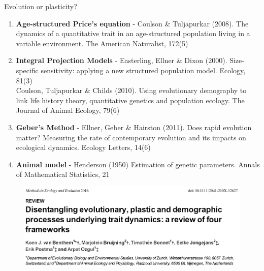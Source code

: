 \documentclass[10pt]{beamer}%
\begin{document}
\begin{frame}{Evolution or plasticity?}

	\begin{enumerate}[<+->]
		\item \textbf{Age-structured Price's equation} \footnotesize - Coulson \& Tuljapurkar (2008). The dynamics of a quantitative trait in an age-structured population living in a variable environment. The American Naturalist, 172(5)
		\item \textbf{Integral Projection Models} \footnotesize - Easterling, Ellner \& Dixon (2000). Size-specific sensitivity: applying a new structured population model. Ecology, 81(3)\\
		Coulson, Tuljapurkar \& Childs (2010). Using evolutionary demography to link life history theory, quantitative genetics and population ecology. The Journal of Animal Ecology, 79(6)
		\item \textbf{Geber's Method} \footnotesize - Ellner, Geber \& Hairston (2011). Does rapid evolution matter? Measuring the rate of contemporary evolution and its impacts on ecological dynamics. Ecology Letters, 14(6)
		\item \textbf{Animal model} \footnotesize - Henderson (1950) Estimation of genetic parameters. Annals of Mathematical Statistics, 21
	\end{enumerate}
\end{frame}

\begin{frame}
	
	\begin{figure}
	\includegraphics[width=\textwidth]{Figures/Decpop}
	\end{figure}
	
\end{frame}
\end{document}

